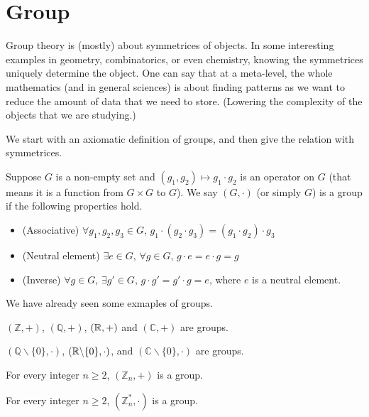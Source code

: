 \section{Group}
Group theory is (mostly) about symmetrices of objects.
In some interesting examples in geometry, combinatorics,
or even chemistry, knowing the symmetrices uniquely 
determine the object. One can say that at a meta-level,
the whole mathematics (and in general sciences) is about
finding patterns as we want to reduce the amount of
data that we need to store. (Lowering the complexity
of the objects that we are studying.)

We start with an axiomatic definition of groups, and then 
give the relation with symmetrices.
\begin{definition}
    Suppose $G$ is a non-empty set and $(g_1,g_2)\mapsto g_1\cdot g_2$
    is an operator on $G$ (that means it is a function from $G\times G$
    to $G$). We say $(G,\cdot)$ (or simply $G$) is a group if the 
    following properties hold.
    \begin{itemize}
        \item (Associative) $\forall g_1,g_2,g_3\in G$, $g_1\cdot (g_2\cdot g_3)=(g_1\cdot g_2)\cdot g_3$
        \item (Neutral element) $\exists e\in G$, $\forall g\in G$, $g\cdot e=e\cdot g=g$
        \item (Inverse) $\forall g\in G$, $\exists g'\in G$, $g\cdot g'=g'\cdot g=e$, where $e$ is a neutral element.
    \end{itemize}
\end{definition}

We have already seen some exmaples of groups.
\begin{example}
    $(\mathbb{Z},+)$, $(\mathbb{Q},+)$, $(\mathbb{R},+)$ and $(\mathbb{C},+)$ are groups.
\end{example}

\begin{example}
    $(\mathbb{Q}\backslash\{0\},\cdot)$, $(\mathbb{R}\backslash\{0\},\cdot)$, and 
    $(\mathbb{C}\backslash\{0\},\cdot)$ are groups.
\end{example}

\begin{example}
    For every integer $n\geq 2$, $(\mathbb{Z}_n,+)$ is a group.
\end{example}

\begin{example}
    For every integer $n\geq 2$, $(\mathbb{Z}_n^*,\cdot)$ is a group.
\end{example}

